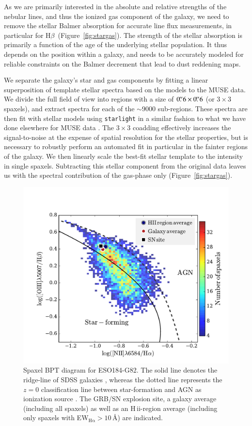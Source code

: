 \documentclass[traditabstract]{aa}
\newcommand{\farc}{\hbox{$.\!\!^{\prime\prime}$}}
\newcommand{\hb}{H$\beta$}
\newcommand{\hii}{\mbox{H\,{\sc ii}}}
\begin{document}
As we are primarily interested in the absolute and relative strengths of the nebular lines, and thus the ionized gas component of the galaxy, we need to remove the stellar Balmer absorption for accurate line flux measurements, in particular for \hb\, (Figure~\ref{fig:stargas}). The strength of the stellar absorption is primarily a function of the age of the underlying stellar population. It thus depends on the position within a galaxy, and needs to be accurately modeled for reliable constraints on the Balmer decrement that lead to dust reddening maps.

We separate the galaxy's star and gas components by fitting a linear superposition of template stellar spectra based on the \citet{2003MNRAS.344.1000B} models to the MUSE data. We divide the full field of view into regions with a size of $0\farc{6}\times0\farc{6}$ (or $3 \times 3$ spaxels), and extract spectra for each of the $\sim9000$ sub-regions. These spectra are then fit with stellar models using \texttt{starlight} \citep{2005MNRAS.358..363C, 2009RMxAC..35..127C} in a similar fashion to what we have done elsewhere for MUSE data \citep{2016MNRAS.455.4087G, 2016arXiv160703446K, 2016arXiv160900013P}. The $3\times3$ coadding effectively increases the signal-to-noise at the expense of spatial resolution for the stellar properties, but is necessary to robustly perform an automated fit in particular in the fainter regions of the galaxy. We then linearly scale the best-fit stellar template to the intensity in single spaxels. Subtracting this stellar component from the original data leaves us with the spectral contribution of the gas-phase only (Figure~\ref{fig:stargas}).

\begin{figure}
\begin{center}
  \includegraphics[width=0.75\linewidth]{Figs/MUSE_SN1998bw_BPT.pdf}
\caption{Spaxel BPT diagram for ESO184-G82. The solid line denotes the ridge-line of SDSS galaxies \citep{2008MNRAS.385..769B}, whereas the dotted line represents the $z=0$ classification line between star-formation and AGN as ionization source \citep{2013ApJ...774..100K}. The GRB/SN explosion site, a galaxy average (including all spaxels) as well as an \hii-region average (including only spaxels with EW$_{\mathrm{H\alpha}}>10$\,\AA) are indicated.}
\label{fig:BPT}
\end{center}
\end{figure}
\end{document}
